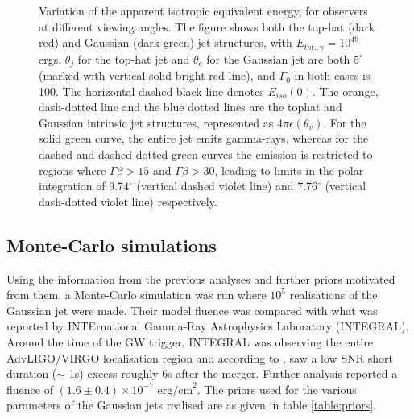    \begin{figure}
        \centering
        \def\svgwidth{\textwidth}
        
        \caption[Variation of the apparent isotropic equivalent energy,
                 for observers at different viewing angles]{
                 Variation of the apparent isotropic equivalent energy, for observers at
                 different viewing angles. The figure shows both the top-hat (dark red)
                 and Gaussian (dark green) jet structures, with $E_{tot., \gamma} =
                 10^{49}$ ergs. $\theta_j$ for the top-hat jet and $\theta_c$ for the
                 Gaussian jet are both $5^{\circ}$ (marked with vertical solid bright
                 red line), and $\Gamma_0$ in both cases is 100. The horizontal dashed
                 black line denotes $E_{iso}(0)$. The orange, dash-dotted line and the
                 blue dotted lines are the tophat and Gaussian intrinsic jet structures,
                 represented as $4\pi\epsilon(\theta_v)$. For the solid green curve, the
                 entire jet emits gamma-rays, whereas for the dashed and dashed-dotted
                 green curves the emission is restricted to regions where $\Gamma \beta
                 > 15$ and $\Gamma \beta  > 30$, leading to limits in the polar
                 integration of 9.74$^\circ$ (vertical dashed violet line) and
                 7.76$^\circ$ (vertical dash-dotted violet line) respectively.
        }
        \label{fig:e_iso}
    \end{figure}

    \subsection{Monte-Carlo simulations}
    \label{sec:mc_sim}

    Using the information from the previous analyses and further priors motivated from
    them, a Monte-Carlo simulation was run where $10^5$ realisations of the Gaussian jet
    were made. Their model fluence was compared with what was reported by INTErnational
    Gamma-Ray Astrophysics Laboratory (INTEGRAL).\\ Around the time of the GW trigger,
    INTEGRAL was observing the entire AdvLIGO/VIRGO localisation region and according to
    \cite{minaev_gcn_2019}, saw a low SNR short duration ($\sim$ 1s) excess roughly 6s
    after the merger. Further analysis reported a fluence of $(1.6 \pm 0.4) \times
    10^{-7} \text{ erg/cm}^2$. The priors used for the various parameters of the
    Gaussian jets realised are as given in table \ref{table:priors}.

